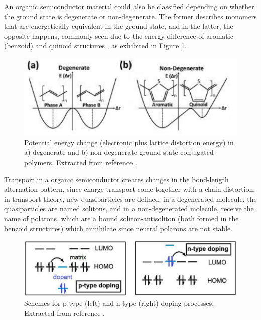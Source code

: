 
An organic semiconductor material could also be classified depending on whether the ground state is degenerate or non-degenerate. The former describes monomers that are energetically equivalent in the ground state, and in the latter, the opposite happens, commonly seen due to the energy difference of aromatic (benzoid) and quinoid structures \cite{heegerSolitonsConductingPolymers1988a}, as exhibited in Figure \ref{fig:energy}.

\begin{figure}[h]
  \centering
  \includegraphics[width=12cm]{Images/pdf/deg_pol.pdf}
  \caption[Degenerate and non-degenerate conjugated polymers]{Potential energy change (electronic plus lattice distortion energy) in a) degenerate and b) non-degenerate ground-state-conjugated polymers. Extracted from reference \cite{heydarigharahcheshmehTextureNanostructuralEngineering2020}.}
  \label{fig:energy}
\end{figure}

Transport in a organic semiconductor creates changes in the bond-length alternation pattern, since charge transport come together with a chain distortion, in transport theory, new quasiparticles are defined: in a degenerated molecule, the quasiparticles are named solitons, and in a non-degenerated molecule, receive the name of polarons, which are a bound soliton-antisoliton (both formed in the benzoid structures) which annihilate since neutral polarons are not stable.

\begin{figure}[h]
  \centering
  \includegraphics[width=12cm]{Images/pdf/doping.pdf}
  \caption[Scheme of doping processes in organic semiconductors]{Schemes for p-type (left) and n-type (right) doping processes. Extracted from reference \cite{lussemDopingOrganicSemiconductors2013}.}
  \label{fig:dopscheme}
\end{figure}

